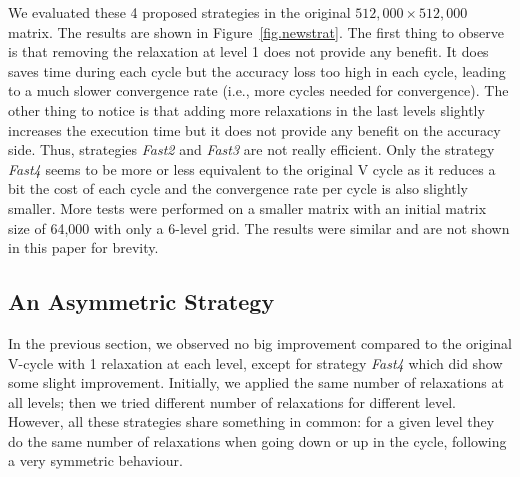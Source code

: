 
We evaluated these 4 proposed strategies in the original $512,000\times
512,000$ matrix.  The results are shown in Figure~\ref{fig.newstrat}.  The
first thing to observe is that removing the relaxation at level 1 does not
provide any benefit. It does saves time during each cycle but the accuracy loss
too high in each cycle, leading to a much slower convergence rate (i.e., more
cycles needed for convergence).  The other thing to notice is that adding more
relaxations in the last levels slightly increases the execution time but it
does not provide any benefit on the accuracy side. Thus, strategies
\emph{Fast2} and \emph{Fast3} are not really efficient.  Only the strategy
\emph{Fast4} seems to be more or less equivalent to the original V cycle as it
reduces a bit the cost of each cycle and the convergence rate per cycle is also
slightly smaller.  More tests were performed on a smaller matrix with an
initial matrix size of 64,000 with only a 6-level grid.  The results were
similar and are not shown in this paper for brevity.




\subsection{An Asymmetric Strategy}
\label{sec.assymetric}

In the previous section, we observed no big improvement compared to the
original V-cycle with 1 relaxation at each level, except for strategy
\emph{Fast4} which did show some slight improvement. Initially, we applied the
same number of relaxations at all levels; then we tried different number of
relaxations for different level. However, all these strategies share something
in common: for a given level they do the same number of relaxations when going
down or up in the cycle, following a very symmetric behaviour.

